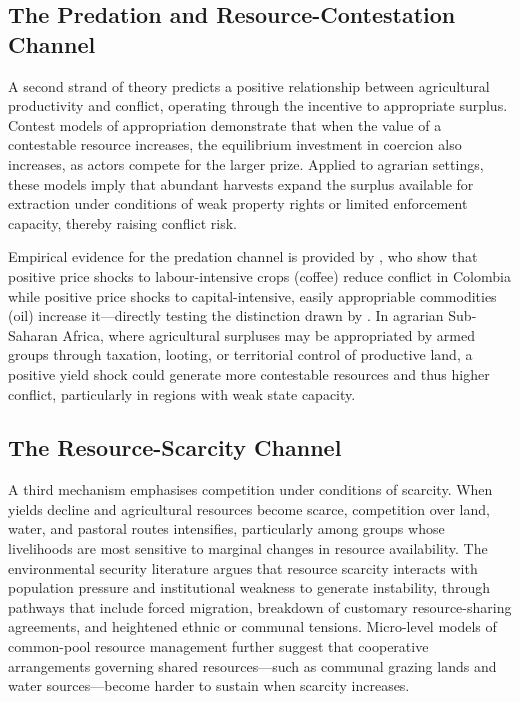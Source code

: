 \subsection{The Predation and Resource-Contestation Channel}

A second strand of theory predicts a positive relationship between agricultural productivity and conflict, operating through the incentive to appropriate surplus. Contest models of appropriation \citep{Tullock1980, Skaperdas1996, Hirshleifer1991} demonstrate that when the value of a contestable resource increases, the equilibrium investment in coercion also increases, as actors compete for the larger prize. Applied to agrarian settings, these models imply that abundant harvests expand the surplus available for extraction under conditions of weak property rights or limited enforcement capacity, thereby raising conflict risk.

Empirical evidence for the predation channel is provided by \citet{DubeVargas2013}, who show that positive price shocks to labour-intensive crops (coffee) reduce conflict in Colombia while positive price shocks to capital-intensive, easily appropriable commodities (oil) increase it---directly testing the distinction drawn by \citet{DalBoDalBo2011}. In agrarian Sub-Saharan Africa, where agricultural surpluses may be appropriated by armed groups through taxation, looting, or territorial control of productive land, a positive yield shock could generate more contestable resources and thus higher conflict, particularly in regions with weak state capacity.

\subsection{The Resource-Scarcity Channel}

A third mechanism emphasises competition under conditions of scarcity. When yields decline and agricultural resources become scarce, competition over land, water, and pastoral routes intensifies, particularly among groups whose livelihoods are most sensitive to marginal changes in resource availability. The environmental security literature \citep{HomerDixon1994} argues that resource scarcity interacts with population pressure and institutional weakness to generate instability, through pathways that include forced migration, breakdown of customary resource-sharing agreements, and heightened ethnic or communal tensions. Micro-level models of common-pool resource management \citep{Ostrom1990} further suggest that cooperative arrangements governing shared resources---such as communal grazing lands and water sources---become harder to sustain when scarcity increases.


